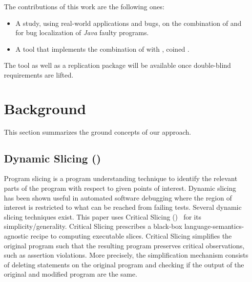\documentclass{article}
\begin{document}
The contributions of this work are the following ones:
\begin{itemize}
	\item A study, using real-world applications and bugs, on the combination
    of \ds{} and \sfl{} for bug localization of \emph{Java} faulty programs.
   \item A tool that implements the combination of \ds{} with \sfl{}, coined
   \comb{}.
\end{itemize}

The tool as well as a replication package will be available once double-blind
requirements are lifted.

\section{Background}
\label{sec:background}

This section summarizes the ground concepts of our approach.

\subsection{Dynamic Slicing (\ds{})}
\label{sec:slicing}

Program slicing is a program understanding technique to identify the
relevant parts of the program with respect to given points of
interest. Dynamic
slicing~\cite{Agrawal:1990:DPS:93542.93576}
has been shown useful in automated software debugging where the region
of interest is restricted to what can be reached from failing
tests. Several dynamic slicing techniques exist. This paper uses
Critical Slicing (\cs{})~\cite{DeMillo:1996:CSS:229000.226310} for its
simplicity/generality. Critical Slicing
prescribes a black-box language-semantics-agnostic recipe to computing
executable slices.  Critical Slicing simplifies the original
program such that the resulting program preserves critical
observations, such as assertion violations. More precisely, the
simplification mechanism consists of deleting statements on the
original program and checking if the output of the original and
modified program are the same.
\end{document}

